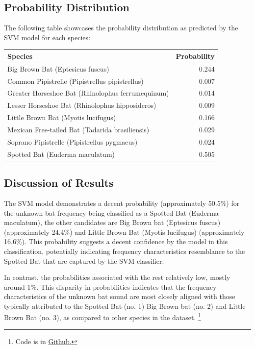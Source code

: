 \documentclass[12pt]{article}
\begin{document}
\subsection{Probability Distribution}
The following table showcases the probability distribution as predicted by the SVM model for each species:

\begin{center}
\begin{tabular}{lr}
\toprule
Species & Probability \\
\midrule
Big Brown Bat (Eptesicus fuscus) & 0.244 \\
Common Pipistrelle (Pipistrellus pipistrellus) & 0.007 \\
Greater Horseshoe Bat (Rhinolophus ferrumequinum) & 0.014 \\
Lesser Horseshoe Bat (Rhinolophus hipposideros) & 0.009 \\
Little Brown Bat (Myotis lucifugus) & 0.166 \\
Mexican Free-tailed Bat (Tadarida brasiliensis) & 0.029 \\
Soprano Pipistrelle (Pipistrellus pygmaeus) & 0.024 \\
Spotted Bat (Euderma maculatum) & 0.505 \\
\bottomrule
\end{tabular}
\end{center}

\subsection{Discussion of Results}
The SVM model demonstrates a decent probability (approximately 50.5\%) for the unknown bat frequency being classified as a Spotted Bat (Euderma maculatum), the other candidates are Big Brown bat (Eptesicus fuscus) (approximately 24.4\%) and Little Brown Bat (Myotis lucifugus) (approximately 16.6\%). This probability suggests a decent confidence by the model in this classification, potentially indicating frequency characteristics resemblance to the Spotted Bat that are captured by the SVM classifier.

In contrast, the probabilities associated with the rest relatively low, mostly around 1\%. This disparity in probabilities indicates that the frequency characteristics of the unknown bat sound are most closely aligned with those typically attributed to the Spotted Bat (no. 1) Big Brown bat (no. 2) and Little Brown Bat (no. 3), as compared to other species in the dataset. \footnote{Code is in \href{https://github.com/hoang-nguyen13/Bat_Sound.git}{Github.}}
\end{document}

